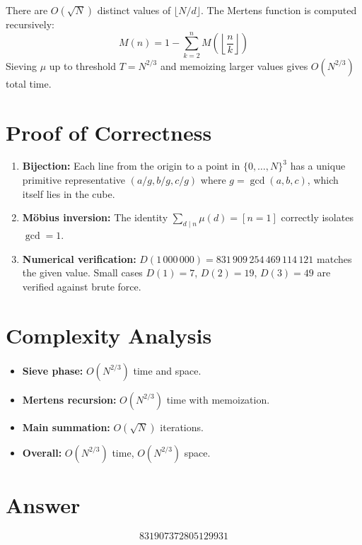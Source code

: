 \documentclass[11pt]{article}
\begin{document}
There are $O(\sqrt{N})$ distinct values of $\lfloor N/d \rfloor$. The Mertens function is computed recursively:
\[
M(n) = 1 - \sum_{k=2}^{n} M\!\left(\left\lfloor \frac{n}{k}\right\rfloor\right)
\]
Sieving $\mu$ up to threshold $T = N^{2/3}$ and memoizing larger values gives $O(N^{2/3})$ total time.

\section{Proof of Correctness}
\begin{enumerate}
    \item \textbf{Bijection:} Each line from the origin to a point in $\{0,\ldots,N\}^3$ has a unique primitive representative $(a/g, b/g, c/g)$ where $g = \gcd(a,b,c)$, which itself lies in the cube.
    \item \textbf{M\"obius inversion:} The identity $\sum_{d \mid n} \mu(d) = [n=1]$ correctly isolates $\gcd = 1$.
    \item \textbf{Numerical verification:} $D(1\,000\,000) = 831\,909\,254\,469\,114\,121$ matches the given value. Small cases $D(1) = 7$, $D(2) = 19$, $D(3) = 49$ are verified against brute force.
\end{enumerate}

\section{Complexity Analysis}
\begin{itemize}
    \item \textbf{Sieve phase:} $O(N^{2/3})$ time and space.
    \item \textbf{Mertens recursion:} $O(N^{2/3})$ time with memoization.
    \item \textbf{Main summation:} $O(\sqrt{N})$ iterations.
    \item \textbf{Overall:} $O(N^{2/3})$ time, $O(N^{2/3})$ space.
\end{itemize}

\section{Answer}

\[
\boxed{831907372805129931}
\]
\end{document}
